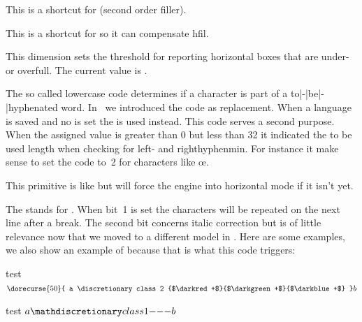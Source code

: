 \stopoldprimitive

\startoldprimitive[title={\prm {hfill}}]

This is a shortcut for  (second order filler).

\stopoldprimitive

\startoldprimitive[title={\prm {hfilneg}}]

This is a shortcut for  so it can compensate \prm
{hfil}.

\stopoldprimitive

\startoldprimitive[title={\prm {hfuzz}}]

This dimension sets the threshold for reporting horizontal boxes that are under-
or overfull. The current value is \the \hfuzz.

\stopoldprimitive

\startnewprimitive[title={\prm {hjcode}}]

The so called lowercase code determines if a character is part of a
to|-|be|-|hyphenated word. In \LUATEX\ we introduced the  code as replacement. When a language is saved and no 
is set the  is used instead. This code serves a second purpose. When
the assigned value is greater than 0 but less than 32 it indicated the to be used
length when checking for left- and righthyphenmin. For instance it make sense to
set the code to~2 for characters like œ.

\stopnewprimitive

\startoldprimitive[title={\prm {hkern}}]

This primitive is like  but will force the engine into horizontal mode
if it isn't yet.

\stopoldprimitive

\startnewprimitive[title={\prm {hmcode}}]

The  stands for . When bit~1 is set the
characters will be repeated on the next line after a break. The second bit
concerns italic correction but is of little relevance now that we moved to a
different model in \CONTEXT. Here are some examples, we also show an example of
 because that is what this code triggers:

\startbuffer
test $ \dorecurse {50} {
    a \discretionary class 2 {$\darkred +$}{$\darkgreen +$}{$\darkblue +$}
} b$

test $ a \mathdiscretionary class 1 {-}{-}{-} b$

